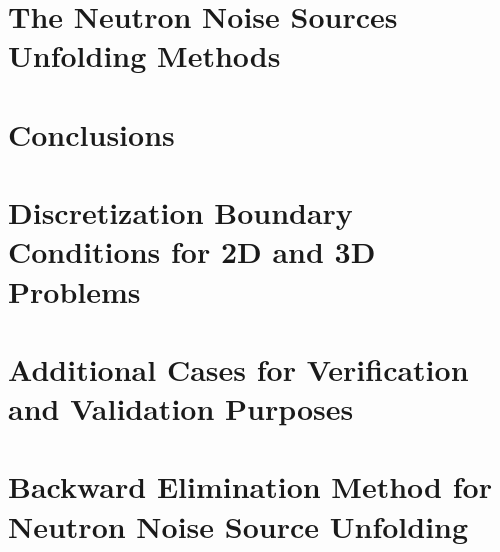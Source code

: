 \documentclass{uiucthesis2021}
\newcounter{counterforappendices}
\begin{document}
\chapter{The Neutron Noise Sources Unfolding Methods}


\chapter{Conclusions}



\backmatter

\printbibliography[heading=bibintoc,title={References}]

\clearpage
\setcounter{counterforappendices}{\value{page}}
\mainmatter
\setcounter{page}{\value{counterforappendices}}

\appendix

\chapter{Discretization Boundary Conditions for 2D and 3D Problems}


\chapter{Additional Cases for Verification and Validation Purposes}


\chapter{Backward Elimination Method for Neutron Noise Source Unfolding}

\end{document}
